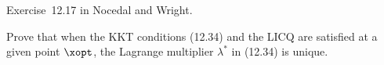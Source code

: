 \begin{problem}\label{prob:04}%
  Exercise~12.17 in Nocedal and Wright.
  
  Prove that when the KKT conditions (12.34) and the LICQ are satisfied at a given point $\xopt$, the Lagrange multiplier $\lambda^{*}$ in (12.34) is unique.
\end{problem}


